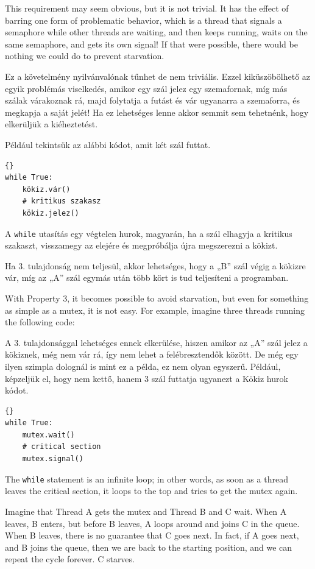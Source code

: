 \documentclass{book}
\begin{document}
This requirement may seem obvious, but it is not trivial.  It has the
effect of barring one form of problematic behavior, which is a thread
that signals a semaphore while other threads are waiting, and then
keeps running, waits on the same semaphore, and gets its own signal!
If that were possible, there would be nothing we
could do to prevent starvation.

Ez a követelmény nyilvánvalónak tűnhet de nem triviális.
Ezzel kiküszöbölhető az egyik problémás viselkedés, amikor egy szál jelez
egy szemafornak, míg más szálak várakoznak rá, majd folytatja a futást és
vár ugyanarra a szemaforra, és megkapja a saját jelét!
Ha ez lehetséges lenne akkor semmit sem tehetnénk, hogy elkerüljük a kiéheztetést.

Például tekintsük az alábbi kódot, amit két szál futtat.

\begin{lstlisting}[title={Kökiz hurok}]{}
while True:
    kökiz.vár()
    # kritikus szakasz 
    kökiz.jelez()
\end{lstlisting}

A {\tt while} utasítás egy végtelen hurok, magyarán, ha a szál elhagyja a
kritikus szakaszt, visszamegy az elejére és megpróbálja újra megszerezni a kökizt.

Ha 3. tulajdonság nem teljesül, akkor lehetséges, hogy a „B”
szál végig a kökizre vár, míg az „A” szál egymás után több
kört is tud teljesíteni a programban.

With Property 3, it becomes possible to avoid starvation, but
even for something as simple as a mutex, it is not easy.
For example, imagine three threads
running the following code:


A 3. tulajdonsággal lehetséges ennek elkerülése, hiszen amikor
az „A” szál jelez a kökiznek, még nem vár rá, így nem lehet
a felébresztendők között.
De még egy ilyen
szimpla dolognál is mint ez a példa, ez nem olyan egyszerű. Például, képzeljük el,
hogy nem kettő, hanem 3 szál futtatja ugyanezt a Kökiz hurok kódot.

\begin{lstlisting}[title={Mutex loop}]{}
while True:
    mutex.wait()
    # critical section 
    mutex.signal()
\end{lstlisting}

The {\tt while} statement is an infinite loop; in other words,
as soon as a thread leaves the critical section, it loops to the
top and tries to get the mutex again.

Imagine that Thread A gets the mutex and Thread B and C wait.
When A leaves, B enters, but before B leaves, A loops around
and joins C in the queue.  When B leaves, there is no guarantee
that C goes next.  In fact, if A goes next, and B joins the
queue, then we are back to the starting position, and we can
repeat the cycle forever.  C starves.
\end{document}

